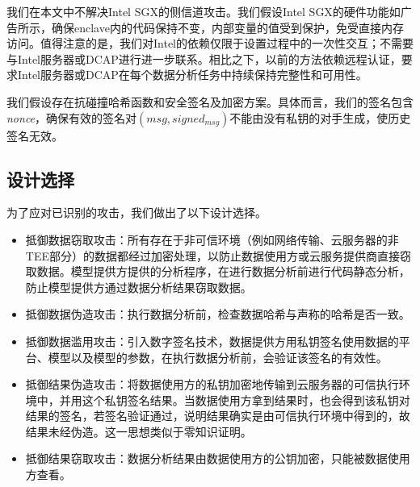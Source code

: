 我们在本文中不解决Intel SGX的侧信道攻击。我们假设Intel SGX的硬件功能如广告所示，确保enclave内的代码保持不变，内部变量的值受到保护，免受直接内存访问。值得注意的是，我们对Intel的依赖仅限于设置过程中的一次性交互；不需要与Intel服务器或DCAP进行进一步联系。相比之下，以前的方法依赖远程认证，要求Intel服务器或DCAP在每个数据分析任务中持续保持完整性和可用性。

我们假设存在抗碰撞哈希函数和安全签名及加密方案。具体而言，我们的签名包含\textit{nonce}，确保有效的签名对$(msg, signed_{msg})$不能由没有私钥的对手生成，使历史签名无效。

\subsection{设计选择}
为了应对已识别的攻击，我们做出了以下设计选择。
\begin{itemize}
    \item 抵御数据窃取攻击：所有存在于非可信环境（例如网络传输、云服务器的非TEE部分）的数据都经过加密处理，以防止数据使用方或云服务提供商直接窃取数据。模型提供方提供的分析程序，在进行数据分析前进行代码静态分析，防止模型提供方通过数据分析结果窃取数据。
    \item 抵御数据伪造攻击：执行数据分析前，检查数据哈希与声称的哈希是否一致。
    \item 抵御数据滥用攻击：引入数字签名技术，数据提供方用私钥签名使用数据的平台、模型以及模型的参数，在执行数据分析前，会验证该签名的有效性。
    \item 抵御结果伪造攻击：将数据使用方的私钥加密地传输到云服务器的可信执行环境中，并用这个私钥签名结果。当数据使用方拿到结果时，也会得到该私钥对结果的签名，若签名验证通过，说明结果确实是由可信执行环境中得到的，故结果未经伪造。这一思想类似于零知识证明。
    \item 抵御结果窃取攻击：数据分析结果由数据使用方的公钥加密，只能被数据使用方查看。
\end{itemize} 